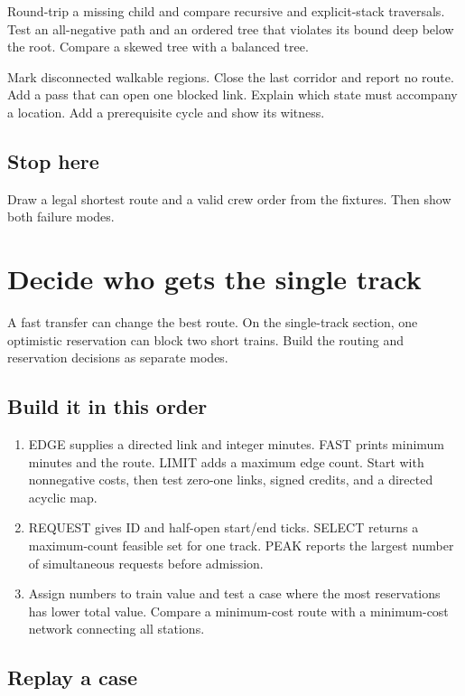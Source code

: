 \documentclass[11pt,letterpaper]{article}
\begin{document}
Round-trip a missing child and compare recursive and explicit-stack traversals. Test an all-negative path and an ordered tree that violates its bound deep below the root. Compare a skewed tree with a balanced tree.

Mark disconnected walkable regions. Close the last corridor and report no route. Add a pass that can open one blocked link. Explain which state must accompany a location. Add a prerequisite cycle and show its witness.

\subsection*{Stop here}

Draw a legal shortest route and a valid crew order from the fixtures. Then show both failure modes.

\clearpage

\section{Decide who gets the single track}\label{trains:05}

A fast transfer can change the best route. On the single-track section, one optimistic reservation can block two short trains. Build the routing and reservation decisions as separate modes.

\subsection*{Build it in this order}

\begin{enumerate}
\item EDGE supplies a directed link and integer minutes. FAST prints minimum minutes and the route. LIMIT adds a maximum edge count. Start with nonnegative costs, then test zero-one links, signed credits, and a directed acyclic map.
\item REQUEST gives ID and half-open start/end ticks. SELECT returns a maximum-count feasible set for one track. PEAK reports the largest number of simultaneous requests before admission.
\item Assign numbers to train value and test a case where the most reservations has lower total value. Compare a minimum-cost route with a minimum-cost network connecting all stations.
\end{enumerate}

\subsection*{Replay a case}
\end{document}
